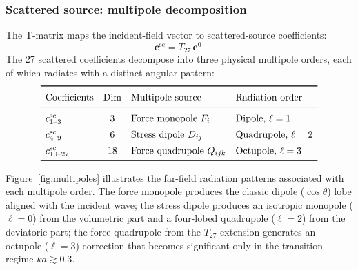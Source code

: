 \subsubsection{Scattered source: multipole decomposition}
\label{sec:multipole}

The T-matrix maps the incident-field vector to scattered-source
coefficients:
\begin{equation}
  \bm{c}^{\mathrm{sc}} = T_{27}\,\bm{c}^0.
  \label{eq:csc-def}
\end{equation}
The 27 scattered coefficients decompose into three physical multipole
orders, each of which radiates with a distinct angular pattern:
\begin{equation}
\renewcommand{\arraystretch}{1.4}
\begin{array}{lcll}
\toprule
\text{Coefficients} & \text{Dim} & \text{Multipole source}
  & \text{Radiation order} \\
\midrule
c^{\mathrm{sc}}_{1\text{--}3}
  & 3 & \text{Force monopole } F_i
  & \text{Dipole, } \ell = 1 \\
c^{\mathrm{sc}}_{4\text{--}9}
  & 6 & \text{Stress dipole } D_{ij}
  & \text{Quadrupole, } \ell = 2 \\
c^{\mathrm{sc}}_{10\text{--}27}
  & 18 & \text{Force quadrupole } Q_{ijk}
  & \text{Octupole, } \ell = 3 \\
\bottomrule
\end{array}
\label{eq:multipole-table}
\end{equation}

Figure~\ref{fig:multipoles} illustrates the far-field radiation patterns
associated with each multipole order.  The force monopole produces the
classic dipole ($\cos\theta$) lobe aligned with the incident wave;
the stress dipole produces an isotropic monopole ($\ell = 0$) from the
volumetric part and a four-lobed quadrupole ($\ell = 2$) from the
deviatoric part; the force quadrupole from the $T_{27}$ extension
generates an octupole ($\ell = 3$) correction that becomes significant
only in the transition regime $ka \gtrsim 0.3$.

